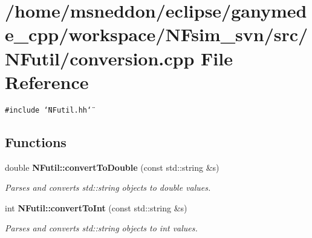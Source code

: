 \section{/home/msneddon/eclipse/ganymede\_\-cpp/workspace/NFsim\_\-svn/src/NFutil/conversion.cpp File Reference}
\label{conversion_8cpp}


{\tt \#include \char`\"{}NFutil.hh\char`\"{}}\par
\subsection*{Functions}
\begin{CompactItemize}
\item 
double {\bf NFutil::convertToDouble} (const std::string \&s)
\begin{CompactList}\small\item\em Parses and converts std::string objects to double values. \item\end{CompactList}\item 
int {\bf NFutil::convertToInt} (const std::string \&s)
\begin{CompactList}\small\item\em Parses and converts std::string objects to int values. \item\end{CompactList}\end{CompactItemize}

